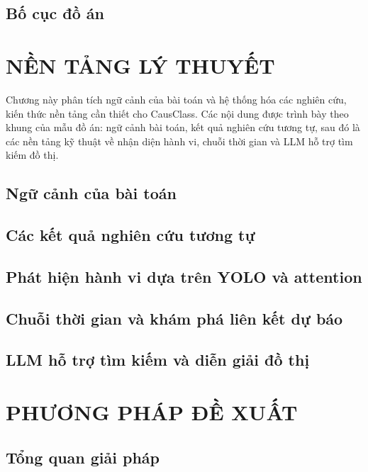 \documentclass[a4paper,13pt,3p,twoside]{report}
\numberwithin{equation}{chapter}
\theoremstyle{definition}
\begin{document}
\section{Bố cục đồ án}


\newpage
\chapter{NỀN TẢNG LÝ THUYẾT}

Chương này phân tích ngữ cảnh của bài toán và hệ thống hóa các nghiên cứu, kiến thức nền tảng cần thiết cho CausClass. Các nội dung được trình bày theo khung của mẫu đồ án: ngữ cảnh bài toán, kết quả nghiên cứu tương tự, sau đó là các nền tảng kỹ thuật về nhận diện hành vi, chuỗi thời gian và LLM hỗ trợ tìm kiếm đồ thị.

\section{Ngữ cảnh của bài toán}


\section{Các kết quả nghiên cứu tương tự}


\section{Phát hiện hành vi dựa trên YOLO và attention}


\section{Chuỗi thời gian và khám phá liên kết dự báo}


\section{LLM hỗ trợ tìm kiếm và diễn giải đồ thị}


\newpage
\chapter{PHƯƠNG PHÁP ĐỀ XUẤT}

\section{Tổng quan giải pháp}

\end{document}
